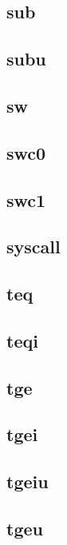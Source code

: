 \subsection*{sub}

\subsection*{subu}

\subsection*{sw}

\subsection*{swc0}

\subsection*{swc1}

\subsection*{syscall}

\subsection*{teq}

\subsection*{teqi}

\subsection*{tge}

\subsection*{tgei}

\subsection*{tgeiu}

\subsection*{tgeu}

